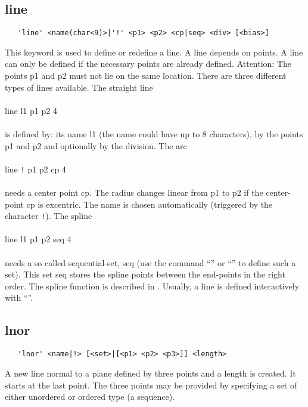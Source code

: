 \documentclass{article}
\begin{document}
\subsection{\label{line}line}
\begin{verbatim}
   'line' <name(char<9)>|'!' <p1> <p2> <cp|seq> <div> [<bias>] 
\end{verbatim}
This keyword is used to define or redefine a line. A line depends on points. A line can only be defined if the necessary points are already defined. Attention: The points p1 and p2 must not lie on the same location. There are three different types of lines available. The straight line\\\\
line l1 p1 p2 4\\\\
is defined by: its name l1 (the name could have up to 8 characters), by the points p1 and p2 and optionally by the division. The arc\\\\
line \verb_!_ p1 p2 cp 4\\\\
needs a center point cp. The radius changes linear from p1 to p2 if the center-point cp is excentric. The name is chosen automatically (triggered by the character \verb_!_). The spline\\\\
line l1 p1 p2 seq 4\\\\
needs a so called sequential-set, seq (use the command ``'' or ``'' to define such a set). This set seq stores the spline points between the end-points in the right order. The spline function is described in \cite{spline}. Usually, a line is defined interactively with ``''. 

\subsection{\label{lnor}lnor}
\begin{verbatim}
   'lnor' <name|!> [<set>|[<p1> <p2> <p3>]] <length> 
\end{verbatim}
A new line normal to a plane defined by three points and a length is created. It starts at the last point. The three points may be provided by specifying a set of either unordered or ordered type (a sequence).
\end{document}
